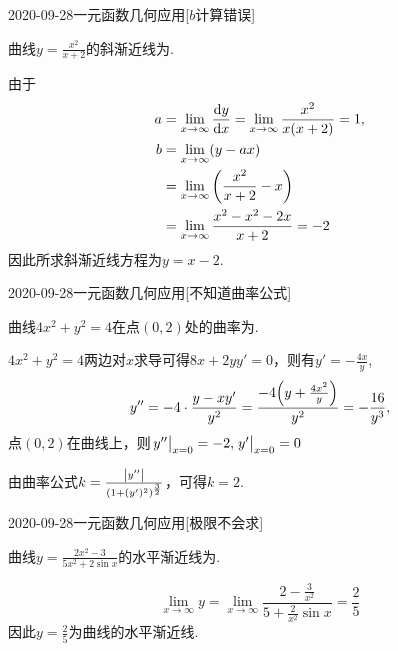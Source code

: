 \documentclass{ctexart}
\begin{document}
\begin{mathques}{2020-09-28}{一元函数几何应用}[$b$计算错误]
\begin{ques}
曲线$y = \frac{x^2}{x + 2}$的斜渐近线为\mathblank.
\end{ques}
\begin{solu}

  由于
  \begin{align*}
    a &= \lim_{x \to \infty} \dv{y}{x} = \lim_{x \to \infty} \frac{x^2}{x(x + 2)} =
    1, \\
    b &= \lim_{x \to \infty} (y - ax) \\
    &= \lim_{x \to \infty} \qty(\frac{x^2}{x + 2} - x) \\
    &= \lim_{x \to \infty} \frac{x^2 - x^2 - 2x}{x + 2} = -2
  \end{align*}
  因此所求斜渐近线方程为$y = x - 2.$
\end{solu}
\end{mathques}

\begin{mathques}{2020-09-28}{一元函数几何应用}[不知道曲率公式]
\begin{ques}
  曲线$4x^2 + y^2 = 4$在点$(0, 2)$处的曲率为\mathblank.
\end{ques}
\begin{solu}

  $4x^2 + y^2 = 4$两边对$x$求导可得$8x + 2yy' = 0$，则有$y' = -\frac{4x}{y}$,
  \[
    y'' = -4\cdot \frac{y - xy'}{y^2} = \frac{-4\qty(y + \frac{4x^2}{y})}{y^2}
    = -\frac{16}{y^3},
  \]
  点$(0, 2)$在曲线上，则$\eval{y''}_{x = 0} = -2, \eval{y'}_{x = 0} = 0$

  由曲率公式$k = \frac{\abs{y''}}{\qty(1 + (y')^2)^{\frac{3}{2}}}$，可得$k =
  2.$
\end{solu}
\end{mathques}

\begin{mathques}{2020-09-28}{一元函数几何应用}[极限不会求]
\begin{ques}
曲线$y = \frac{2x^2 - 3}{5x^2 + 2\sin x}$的水平渐近线为\mathblank.
\end{ques}
\begin{solu}

  \[
  \lim_{x \to \infty} y = \lim_{x \to \infty} \frac{2 - \frac{3}{x^2}}{5 +
  \frac{2}{x^2} \sin x} = \frac{2}{5}
  \]
  因此$y = \frac{2}{5}$为曲线的水平渐近线.
\end{solu}
\end{mathques}
\end{document}
